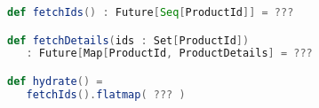 \documentclass[10pt]{beamer}
\begin{document}
\begin{frame}[fragile]
\begin{lstlisting}[language=Scala, basicstyle=\ttfamily]
def fetchIds() : Future[Seq[ProductId]] = ???

def fetchDetails(ids : Set[ProductId]) 
   : Future[Map[ProductId, ProductDetails] = ???

def hydrate() = 
   fetchIds().flatmap( ??? )

\end{lstlisting}
\end{frame}























\end{document}
